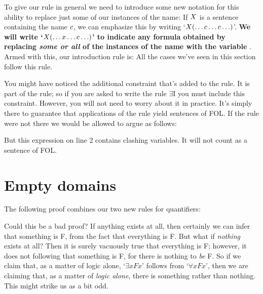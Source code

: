 To give our rule in general we need to introduce some new notation for this ability to replace just some of our instances of the name: If $X$ is a sentence containing the name $c$, we can emphasize this by writing `$X(\ldots c \ldots c\ldots)$'. \textbf{We will write `$X(\ldots x \ldots c\ldots)$' to indicate any formula obtained by replacing \emph{some or all} of the instances of the name  with the variable }. Armed with this, our introduction rule is:
All the cases we've seen in this section follow this rule.

You might have noticed the additional constraint that's added to the rule. It is {part} of the rule; so if you are asked to write the rule $\exists$I  you {must} include this constraint. However, you will not need to worry about it in practice. It's simply there to guarantee that applications of the rule yield sentences of FOL. If the rule were not there we would be allowed to argue as follows:
\begin{pf}
\end{pf}But this expression on line 2 contains clashing variables. It will not count as a sentence of FOL.


\section{Empty domains}
The following proof combines our two new rules for quantifiers:
	\begin{pf}
	\end{pf}
Could this be a bad proof? If anything exists at all, then certainly we can infer that something is F, from the fact that everything is F. But what if \emph{nothing} exists at all? Then it is surely vacuously true that everything is F; however, it does not following that something is F, for there is nothing to \emph{be} F. So if we claim that, as a matter of logic alone, `$\exists x Fx$' follows from `$\forall x Fx$', then we are claiming that, as a matter of \emph{logic alone}, there is something rather than nothing. This might strike us as a bit odd.

